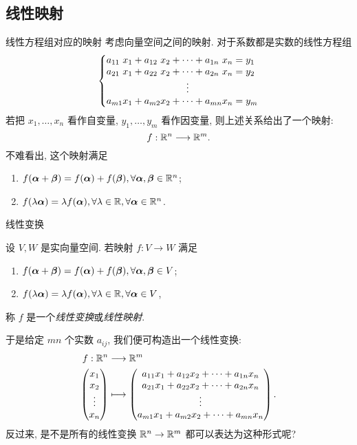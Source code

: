 \subsection{线性映射}
\begin{frame}{线性方程组对应的映射\noexer}
	\onslide<+->
	考虑向量空间之间的映射.
	\onslide<+->
	对于系数都是实数的线性方程组
	\[\laeq[lclcclcl]{
		a_{11}&x_1+{}&a_{12}&x_2&{}+\cdots+{}&a_{1n}&x_n={}&y_1\\
		a_{21}&x_1+{}&a_{22}&x_2&{}+\cdots+{}&a_{2n}&x_n={}&y_2\\
		&&&&\vdots&&&\\
		a_{m1}&x_1+{}&a_{m2}&x_2&{}+\cdots+{}&a_{mn}&x_n={}&y_m
	}\]
	\onslide<+->
	若把 $x_1,\dots,x_n$ 看作自变量, $y_1,\dots,y_m$ 看作因变量, 则上述关系给出了一个映射:
	\[f:{\mathbb{R}}^n\longrightarrow{\mathbb{R}}^m.\]
	\onslide<+->
	不难看出, 这个映射满足
	\begin{enumerate}
		\item $f({\boldsymbol{\alpha}}+{\boldsymbol{\beta}})=f({\boldsymbol{\alpha}})+f({\boldsymbol{\beta}}),\forall {\boldsymbol{\alpha}},{\boldsymbol{\beta}}\in {\mathbb{R}}^n$;
		\item $f(\lambda {\boldsymbol{\alpha}})=\lambda f({\boldsymbol{\alpha}}),\forall \lambda\in{\mathbb{R}},\forall{\boldsymbol{\alpha}}\in {\mathbb{R}}^n$.
	\end{enumerate}
\end{frame}


\begin{frame}{线性变换\noexer}
	\onslide<+->
	\begin{definition}
		设 $V,W$ 是实向量空间.
		若映射 $f:V\to W$ 满足
		\begin{enumerate}[<*>]
			\item $f({\boldsymbol{\alpha}}+{\boldsymbol{\beta}})=f({\boldsymbol{\alpha}})+f({\boldsymbol{\beta}}),\forall {\boldsymbol{\alpha}},{\boldsymbol{\beta}}\in V$;
			\item $f(\lambda {\boldsymbol{\alpha}})=\lambda f({\boldsymbol{\alpha}}),\forall \lambda\in{\mathbb{R}},\forall{\boldsymbol{\alpha}}\in V$,
		\end{enumerate}
		称 $f$ 是一个\emph{线性变换}或\emph{线性映射}.
	\end{definition}
	\onslide<+->
	于是给定 $mn$ 个实数 $a_{ij}$, 我们便可构造出一个线性变换:
	\onslide<+->
	\begin{align*}
		f:\BR^n&\lra\BR^m\\
		\begin{pmatrix}
			x_1\\
			x_2\\
			\vdots\\
			x_n
		\end{pmatrix}&\lto
		\begin{pmatrix}
			a_{11}x_1+a_{12}x_2+\cdots+a_{1n}x_n\\
			a_{21}x_1+a_{22}x_2+\cdots+a_{2n}x_n\\
			\vvdots\\
			a_{m1}x_1+a_{m2}x_2+\cdots+a_{mn}x_n
		\end{pmatrix}.
	\end{align*}
	\onslide<+->
	反过来, 是不是所有的线性变换 ${\mathbb{R}}^n\rightarrow{\mathbb{R}}^m$ 都可以表达为这种形式呢?
\end{frame}


